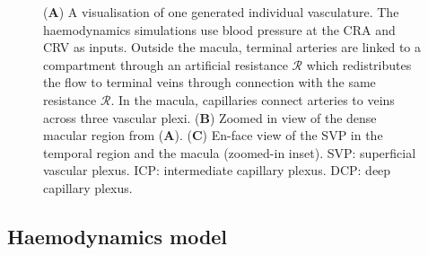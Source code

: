 \documentclass[11pt,]{article}
\begin{document}
\begin{figure}
    \begin{subfigure}[t]{.02\textwidth}
  \end{subfigure}
  \begin{subfigure}[t]{.40\textwidth}
  \end{subfigure}


  \caption{(\textbf{A}) A visualisation of one generated individual vasculature.
    The haemodynamics simulations use blood pressure at the CRA and CRV as inputs.
    Outside the macula, terminal arteries are linked to a compartment through an artificial resistance $\mathcal{R}$
    which redistributes the flow to terminal veins through connection with the same resistance $\mathcal{R}$.
    In the macula, capillaries connect arteries to veins across three vascular plexi.
    (\textbf{B}) Zoomed in view of the dense macular region from (\textbf A).
    (\textbf C) En-face view of the SVP in the temporal region and the macula (zoomed-in inset).
    SVP: superficial vascular plexus. ICP: intermediate capillary plexus. DCP: deep capillary plexus.
  }
  \label{fig:fig2}
\end{figure}

\subsection{Haemodynamics model}\label{sec:haemodynamicModel}
\end{document}
